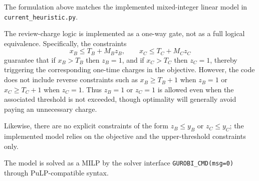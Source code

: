 The formulation above matches the implemented mixed-integer linear model in \texttt{current\_heuristic.py}.

The review-charge logic is implemented as a one-way gate, not as a full logical equivalence. Specifically, the constraints
\[
x_B \le T_B + M_B z_B,\qquad x_C \le T_C + M_C z_C
\]
guarantee that if \(x_B>T_B\) then \(z_B=1\), and if \(x_C>T_C\) then \(z_C=1\), thereby triggering the corresponding one-time charges in the objective. However, the code does not include reverse constraints such as \(x_B \ge T_B+1\) when \(z_B=1\) or \(x_C \ge T_C+1\) when \(z_C=1\). Thus \(z_B=1\) or \(z_C=1\) is allowed even when the associated threshold is not exceeded, though optimality will generally avoid paying an unnecessary charge.

Likewise, there are no explicit constraints of the form \(z_B \le y_B\) or \(z_C \le y_C\); the implemented model relies on the objective and the upper-threshold constraints only.

The model is solved as a MILP by the solver interface \texttt{GUROBI\_CMD(msg=0)} through PuLP-compatible syntax.
